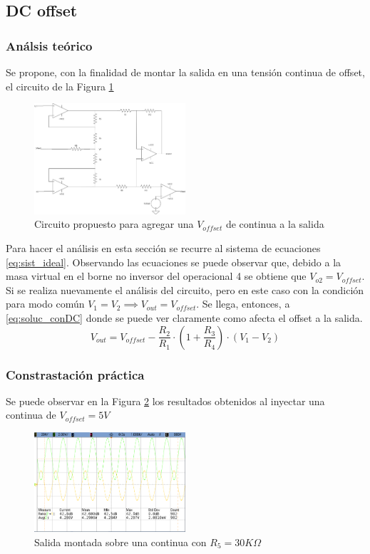 \subsection{DC offset}
\subsubsection{An\'alsis te\'orico}
Se propone, con la finalidad de montar la salida en una tensi\'on continua de offset, el circuito de la Figura \ref{fig:AMP_INST_OFFSET}
\begin{figure}[H]

    \centering
    \includegraphics[width=0.5\textwidth]{../EJ3/Recursos/AMP_INST_OFFSET}
    \caption{Circuito propuesto para agregar una $V_{offset}$ de continua a la salida}
    \label{fig:AMP_INST_OFFSET}
\end{figure}
Para hacer el an\'alisis en esta secci\'on se recurre al sistema de ecuaciones \ref{eq:sist_ideal}.
Observando las ecuaciones se puede observar que, debido a la masa virtual en el borne no inversor del operacional 4 se obtiene que $V_{o2} = V_{offset}$.
Si se realiza nuevamente el an\'alisis del circuito, pero en este caso con la condici\'on para modo com\'un $V_1 = V_2 \implies V_{out} = V_{offset}$. Se llega, entonces, a \ref{eq:soluc_conDC} donde se puede ver claramente como afecta el offset a la salida.
\begin{equation}
    V_{out} = V_{offset}-\frac{R_2}{R_1} \cdot \left(1+\frac{R_3}{R_4}\right)\cdot \left(V_1-V_2\right)
    \label{eq:soluc_conDC}
\end{equation}
\subsubsection{Constrastaci\'on pr\'actica}
Se puede observar en la Figura \ref{fig:VDC_BIEN} los resultados obtenidos al inyectar una continua de $V_{offset}=5V$

\begin{figure}[H]

    \centering
    \includegraphics[width=0.5\textwidth]{../EJ3/Recursos/DC_5V}
    \caption{Salida montada sobre una continua con $R_5 = 30 K\Omega$}
    \label{fig:VDC_BIEN}
\end{figure}



